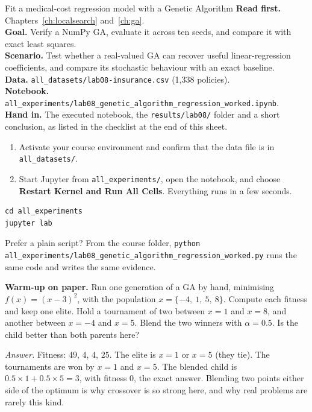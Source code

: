 
\begin{labproject}{Fit a medical-cost regression model with a Genetic Algorithm}
\textbf{Read first.} Chapters~\ref{ch:localsearch} and~\ref{ch:ga}.\\
\textbf{Goal.} Verify a NumPy GA, evaluate it across ten seeds, and compare it with exact least squares.\\
\textbf{Scenario.} Test whether a real-valued GA can recover useful linear-regression coefficients, and compare its stochastic behaviour with an exact baseline.\\
\textbf{Data.} \texttt{all\_datasets/lab08-insurance.csv} (1,338 policies).\\
\textbf{Notebook.} \texttt{all\_experiments/lab08\_genetic\_algorithm\_regression\_worked.ipynb}.\\
\textbf{Hand in.} The executed notebook, the \texttt{results/lab08/} folder and a short conclusion, as listed in the checklist at the end of this sheet.
\end{labproject}

\begin{labmode}
\begin{enumerate}
  \item Activate your course environment and confirm that the data file is in \texttt{all\_datasets/}.
  \item Start Jupyter from \texttt{all\_experiments/}, open the notebook, and choose \textbf{Restart Kernel and Run All Cells}. Everything runs in a few seconds.
\end{enumerate}
\begin{lstlisting}[style=utpterminal]
cd all_experiments
jupyter lab
\end{lstlisting}
Prefer a plain script? From the course folder, \texttt{python all\_experiments/lab08\_genetic\_algorithm\_regression\_worked.py} runs the same code and writes the same evidence.
\end{labmode}



\labroutine

\begin{yourturn}
\textbf{Warm-up on paper.} Run one generation of a GA by hand, minimising $f(x)=(x-3)^2$, with the population $x=\{-4,\ 1,\ 5,\ 8\}$. Compute each fitness and keep one elite. Hold a tournament of two between $x=1$ and $x=8$, and another between $x=-4$ and $x=5$. Blend the two winners with $\alpha=0.5$. Is the child better than both parents here?

\emph{Answer.} Fitness: $49$, $4$, $4$, $25$. The elite is $x=1$ or $x=5$ (they tie). The tournaments are won by $x=1$ and $x=5$. The blended child is $0.5\times1+0.5\times5=3$, with fitness 0, the exact answer. Blending two points either side of the optimum is why crossover is so strong here, and why real problems are rarely this kind.
\end{yourturn}

